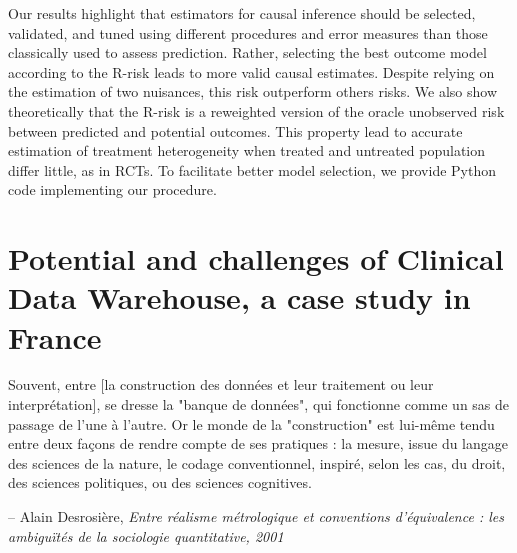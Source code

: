 \documentclass[french,12pt,twoside,a4paper]{book}
\newenvironment{citationbox}{
  \begin{tcolorbox}[
      enhanced,
      colback=gray!10, %
      colframe=white, %
      arc=0mm, %
      boxrule=0.5pt, %
      rightrule=0pt, %
      left=0pt, %
      right=0pt, %
      top=0pt, %
      bottom=0pt, %
      rightupper=0mm, %
      rightlower=0mm, %
      width=0.9\textwidth,
      flush right,
    ]
    \footnotesize %
    \itshape %
    }{
  \end{tcolorbox}%
}
\begin{document}
Our results highlight that estimators for causal inference should be selected,
validated, and tuned using different procedures and error measures than those
classically used to assess prediction. Rather, selecting the best outcome
model according to the R-risk leads to more valid causal estimates. Despite
relying on the estimation of two nuisances, this risk outperform others risks.
We also show theoretically that the R-risk is a reweighted version of the
oracle unobserved risk between predicted and potential outcomes. This property
lead to accurate estimation of treatment heterogeneity when treated and
untreated population differ little, as in RCTs. To facilitate better model
selection, we provide Python code implementing our procedure.


\chapter{Potential and challenges of Clinical Data Warehouse, a case study in France}%
\label{chapter:cdw}%


\begin{citationbox}
  Souvent, entre [la construction des données et leur traitement ou leur
      interprétation], se dresse la "banque de données", qui fonctionne comme un
  sas de passage de l'une à l'autre. Or le monde de la "construction" est
  lui-même tendu entre deux façons de rendre compte de ses pratiques : la
  mesure, issue du langage des sciences de la nature, le codage conventionnel,
  inspiré, selon les cas, du droit, des sciences politiques, ou des sciences
  cognitives.%
  \par\hfill -- Alain Desrosière, \textit{Entre réalisme métrologique et
    conventions d'équivalence : les ambiguïtés de la sociologie quantitative, 2001}
\end{citationbox}

\vspace{2cm}
\end{document}

